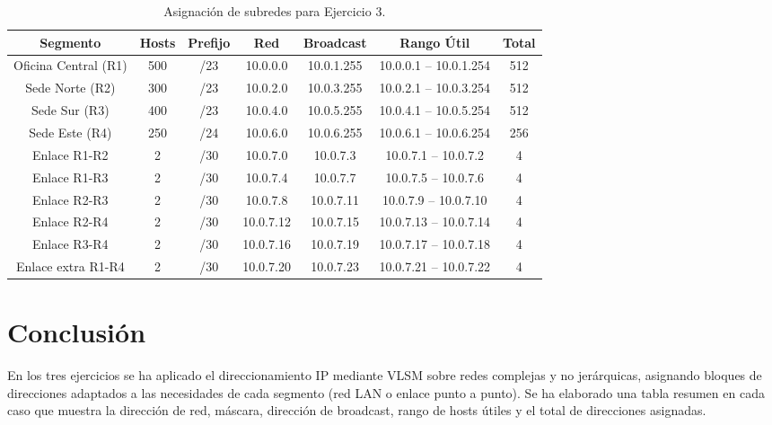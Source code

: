 \documentclass[a4paper,12pt]{article}
\begin{document}
\begin{table}[H]
\centering
\begin{tabular}{|c|c|c|c|c|c|c|}
\hline
\textbf{Segmento} & \textbf{Hosts} & \textbf{Prefijo} & \textbf{Red} & \textbf{Broadcast} & \textbf{Rango Útil} & \textbf{Total} \\
\hline
Oficina Central (R1) & 500 & /23 & 10.0.0.0 & 10.0.1.255 & 10.0.0.1 -- 10.0.1.254 & 512 \\
\hline
Sede Norte (R2) & 300 & /23 & 10.0.2.0 & 10.0.3.255 & 10.0.2.1 -- 10.0.3.254 & 512 \\
\hline
Sede Sur (R3) & 400 & /23 & 10.0.4.0 & 10.0.5.255 & 10.0.4.1 -- 10.0.5.254 & 512 \\
\hline
Sede Este (R4) & 250 & /24 & 10.0.6.0 & 10.0.6.255 & 10.0.6.1 -- 10.0.6.254 & 256 \\
\hline
Enlace R1-R2 & 2 & /30 & 10.0.7.0 & 10.0.7.3 & 10.0.7.1 -- 10.0.7.2 & 4 \\
\hline
Enlace R1-R3 & 2 & /30 & 10.0.7.4 & 10.0.7.7 & 10.0.7.5 -- 10.0.7.6 & 4 \\
\hline
Enlace R2-R3 & 2 & /30 & 10.0.7.8 & 10.0.7.11 & 10.0.7.9 -- 10.0.7.10 & 4 \\
\hline
Enlace R2-R4 & 2 & /30 & 10.0.7.12 & 10.0.7.15 & 10.0.7.13 -- 10.0.7.14 & 4 \\
\hline
Enlace R3-R4 & 2 & /30 & 10.0.7.16 & 10.0.7.19 & 10.0.7.17 -- 10.0.7.18 & 4 \\
\hline
Enlace extra R1-R4 & 2 & /30 & 10.0.7.20 & 10.0.7.23 & 10.0.7.21 -- 10.0.7.22 & 4 \\
\hline
\end{tabular}
\caption{Asignación de subredes para Ejercicio 3.}
\end{table}

\section{Conclusión}
En los tres ejercicios se ha aplicado el direccionamiento IP mediante VLSM sobre redes complejas y no jerárquicas, asignando bloques de direcciones adaptados a las necesidades de cada segmento (red LAN o enlace punto a punto). Se ha elaborado una tabla resumen en cada caso que muestra la dirección de red, máscara, dirección de broadcast, rango de hosts útiles y el total de direcciones asignadas.
\end{document}
